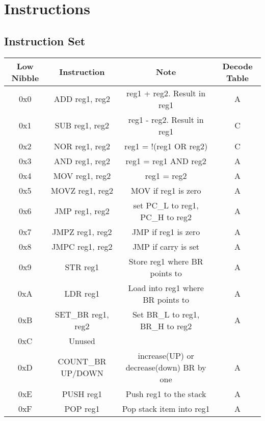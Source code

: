 \documentclass[a4paper, 12pt]{article}
\begin{document}
	\section{Instructions}
	\subsection{Instruction Set}
	\small\begin{center}
		\begin{tabular}{|c|c|c|c|}
			\hline
			Low Nibble & Instruction & Note & Decode Table\\ \hline
			0x0 & ADD reg1, reg2 & reg1 + reg2. Result in reg1 & A\\ \hline
			0x1 & SUB reg1, reg2 & reg1 - reg2. Result in reg1 & C \\ \hline
			0x2 & NOR reg1, reg2 & reg1 = !(reg1 OR reg2) & C \\ \hline
			0x3 & AND reg1, reg2 & reg1 = reg1 AND reg2 & A\\ \hline
			0x4 & MOV reg1, reg2 & reg1 = reg2 & A\\ \hline
			0x5 & MOVZ reg1, reg2 & MOV if reg1 is zero &  A\\ \hline
			0x6 & JMP reg1, reg2 & set PC\_L to reg1, PC\_H to reg2 & A\\ \hline
			0x7 & JMPZ reg1, reg2 & JMP if reg1 is zero & A\\ \hline
			0x8 & JMPC reg1, reg2 & JMP if carry is set & A\\ \hline
			0x9 & STR reg1 & Store reg1 where BR points to & A\\ \hline
			0xA & LDR reg1 & Load into reg1 where BR points to & A\\ \hline
			0xB & SET\_BR reg1, reg2 & Set BR\_L to reg1, BR\_H to reg2 & A\\ \hline
			0xC & Unused &  &  \\ \hline
			0xD & COUNT\_BR UP/DOWN & increase(UP) or decrease(down) BR by one & A\\ \hline
			0xE & PUSH reg1 & Push reg1 to the stack & A\\ \hline
			0xF & POP reg1 & Pop stack item into reg1 & A\\	\hline
		\end{tabular}
	\end{center}
	\newpage
\end{document}
